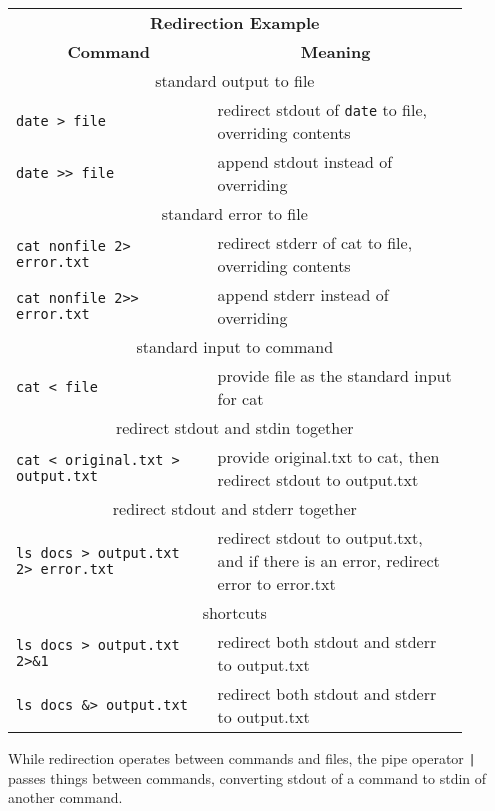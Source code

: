\documentclass[landscape,a0paper,fontscale=0.285]{baposter} %
\begin{document}
\begin{poster}
{\begin{tabular}{p{0.4\linewidth}p{0.5\linewidth}}
\multicolumn{2}{c}{\textbf{Redirection Example }} \\
\multicolumn{1}{c}{\textbf{Command}}  & \multicolumn{1}{c}{\textbf{Meaning}} \\
\hline
\multicolumn{2}{c}{standard output to file} \\
\hline
\texttt{\small{date} > file} & redirect stdout of \texttt{\small{date}} to file, overriding contents \\
\texttt{\small{date >> file}} & append stdout instead of overriding \\
\hline
\multicolumn{2}{c}{standard error to file} \\
\hline
\texttt{\small{\texttt{cat nonfile 2> error.txt}}} & redirect stderr of cat to file, overriding contents \\
\texttt{\small{\texttt{cat nonfile 2>> error.txt}}} & append stderr instead of overriding \\
\hline
\multicolumn{2}{c}{standard input to command} \\
\hline
\texttt{\small{\texttt{cat < file}}} & provide file as the standard input for cat \\
\hline
\multicolumn{2}{c}{redirect stdout and stdin together} \\
\hline
\texttt{\small{cat < original.txt > output.txt}} & provide original.txt to cat, then redirect stdout to output.txt \\
\hline
\multicolumn{2}{c}{redirect stdout and stderr together} \\
\hline
\texttt{\small{ls docs > output.txt 2> error.txt}} & redirect stdout to output.txt, and if there is an error, redirect error to error.txt \\
\hline
\multicolumn{2}{c}{shortcuts} \\
\hline

\texttt{\small{ls docs > output.txt 2>\&1}} & redirect both stdout and stderr to output.txt \\
\texttt{\small{ls docs \&> output.txt}} & redirect both stdout and stderr to output.txt \\

\end{tabular}


While redirection operates between commands and files, the pipe operator \texttt{|} passes things between commands, converting stdout of a command to stdin of another command. \\

}
\end{poster}
\end{document}
